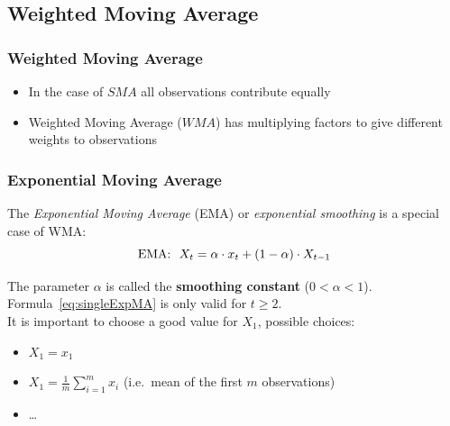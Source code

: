 \documentclass{beamer}
\begin{document}
\subsection{Weighted Moving Average}

\begin{frame}
  \frametitle{Weighted Moving Average}

  \begin{itemize}
    \item In the case of $SMA$ all observations contribute equally
\vspace{0.7cm}    \item Weighted Moving Average ($WMA$) has multiplying factors to give different weights to observations
  \end{itemize}
\end{frame}

\begin{frame}
  \frametitle{Exponential Moving Average}
The \emph{Exponential Moving Average} (EMA) or \emph{exponential smoothing} is a special case of WMA:
\begin{equation}
\textnormal{EMA:}~~ X_t = \alpha \cdot x_t + (1-\alpha) \cdot X_{t-1}
\label{eq:singleExpMA}
\end{equation}

The parameter $\alpha$ is called the \textbf{smoothing constant} ($0 < \alpha < 1$). 
\vfill
Formula~\ref{eq:singleExpMA} is only valid for $t \geq 2$.\\
It is important to choose a good value for $X_1$, possible choices:
  
  \begin{itemize}
    \item $X_1 = x_1$
    \item $X_1 = \frac{1}{m} \sum_{i=1}^{m} x_i$ (i.e.~mean of the first $m$ observations)
    \item \ldots
  \end{itemize}
\end{frame}
\end{document}
